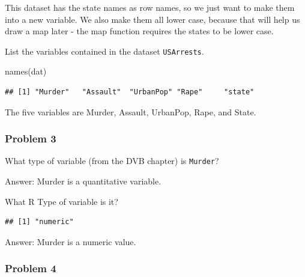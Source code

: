 \documentclass[
]{article}
\newenvironment{Shaded}{\begin{snugshade}}{\end{snugshade}}
\newcommand{\FunctionTok}[1]{\textcolor[rgb]{0.00,0.00,0.00}{#1}}
\newcommand{\NormalTok}[1]{#1}
\newcommand{\OtherTok}[1]{\textcolor[rgb]{0.56,0.35,0.01}{#1}}
\newcommand{\SpecialCharTok}[1]{\textcolor[rgb]{0.00,0.00,0.00}{#1}}
\begin{document}
\begin{Shaded}
\end{Shaded}

This dataset has the state names as row names, so we just want to make
them into a new variable. We also make them all lower case, because that
will help us draw a map later - the map function requires the states to
be lower case.

List the variables contained in the dataset \texttt{USArrests}.

\begin{Shaded}
\begin{Highlighting}[]
\FunctionTok{names}\NormalTok{(dat)}
\end{Highlighting}
\end{Shaded}

\begin{verbatim}
## [1] "Murder"   "Assault"  "UrbanPop" "Rape"     "state"
\end{verbatim}

The five variables are Murder, Assault, UrbanPop, Rape, and State.

\hypertarget{problem-3}{%
\subsubsection{Problem 3}\label{problem-3}}

What type of variable (from the DVB chapter) is \texttt{Murder}?

Answer: Murder is a quantitative variable.

What R Type of variable is it?

\begin{Shaded}
\end{Shaded}

\begin{verbatim}
## [1] "numeric"
\end{verbatim}

Answer: Murder is a numeric value.

\hypertarget{problem-4}{%
\subsubsection{Problem 4}\label{problem-4}}
\end{document}

